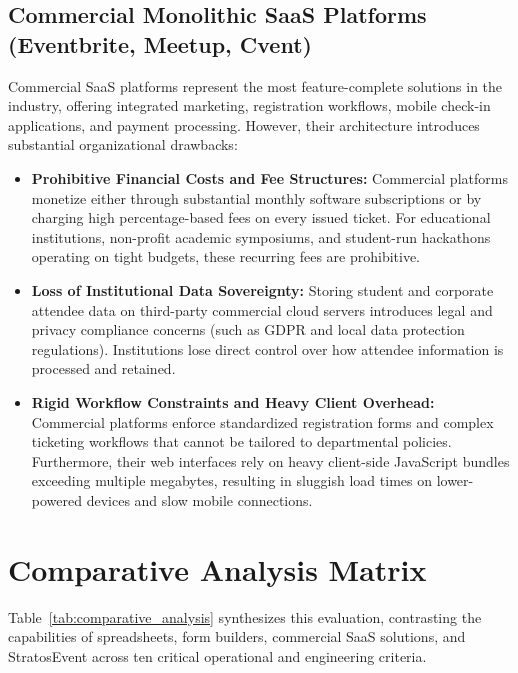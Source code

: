 \documentclass[11pt,a4paper]{report}
\begin{document}
\subsection{Commercial Monolithic SaaS Platforms (Eventbrite, Meetup, Cvent)}
Commercial SaaS platforms represent the most feature-complete solutions in the industry, offering integrated marketing, registration workflows, mobile check-in applications, and payment processing. However, their architecture introduces substantial organizational drawbacks:
\begin{itemize}[leftmargin=1.5em, itemsep=0.4em]
    \item \textbf{Prohibitive Financial Costs and Fee Structures:} Commercial platforms monetize either through substantial monthly software subscriptions or by charging high percentage-based fees on every issued ticket. For educational institutions, non-profit academic symposiums, and student-run hackathons operating on tight budgets, these recurring fees are prohibitive.
    \item \textbf{Loss of Institutional Data Sovereignty:} Storing student and corporate attendee data on third-party commercial cloud servers introduces legal and privacy compliance concerns (such as GDPR and local data protection regulations). Institutions lose direct control over how attendee information is processed and retained.
    \item \textbf{Rigid Workflow Constraints and Heavy Client Overhead:} Commercial platforms enforce standardized registration forms and complex ticketing workflows that cannot be tailored to departmental policies. Furthermore, their web interfaces rely on heavy client-side JavaScript bundles exceeding multiple megabytes, resulting in sluggish load times on lower-powered devices and slow mobile connections.
\end{itemize}

\section{Comparative Analysis Matrix}
\justifying
Table~\ref{tab:comparative_analysis} synthesizes this evaluation, contrasting the capabilities of spreadsheets, form builders, commercial SaaS solutions, and StratosEvent across ten critical operational and engineering criteria.
\end{document}
